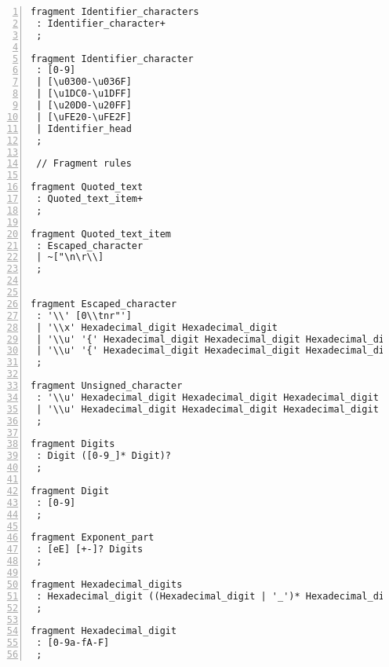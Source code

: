 \begin{lstlisting}[numbers=left,basicstyle=\ttfamily\scriptsize]
fragment Identifier_characters
 : Identifier_character+
 ;

fragment Identifier_character
 : [0-9]
 | [\u0300-\u036F]
 | [\u1DC0-\u1DFF]
 | [\u20D0-\u20FF]
 | [\uFE20-\uFE2F]
 | Identifier_head
 ;

 // Fragment rules

fragment Quoted_text
 : Quoted_text_item+
 ;

fragment Quoted_text_item
 : Escaped_character
 | ~["\n\r\\]
 ;
    

fragment Escaped_character
 : '\\' [0\\tnr"']
 | '\\x' Hexadecimal_digit Hexadecimal_digit
 | '\\u' '{' Hexadecimal_digit Hexadecimal_digit Hexadecimal_digit Hexadecimal_digit '}'
 | '\\u' '{' Hexadecimal_digit Hexadecimal_digit Hexadecimal_digit Hexadecimal_digit Hexadecimal_digit Hexadecimal_digit Hexadecimal_digit Hexadecimal_digit '}'
 ;

fragment Unsigned_character
 : '\\u' Hexadecimal_digit Hexadecimal_digit Hexadecimal_digit Hexadecimal_digit
 | '\\u' Hexadecimal_digit Hexadecimal_digit Hexadecimal_digit Hexadecimal_digit  Hexadecimal_digit Hexadecimal_digit Hexadecimal_digit Hexadecimal_digit
 ;

fragment Digits
 : Digit ([0-9_]* Digit)?
 ;

fragment Digit
 : [0-9]
 ;

fragment Exponent_part
 : [eE] [+-]? Digits
 ;

fragment Hexadecimal_digits
 : Hexadecimal_digit ((Hexadecimal_digit | '_')* Hexadecimal_digit)?
 ;

fragment Hexadecimal_digit
 : [0-9a-fA-F]
 ;
\end{lstlisting}


